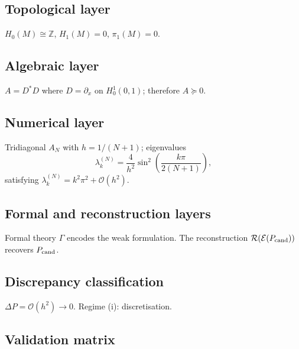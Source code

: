 \documentclass[11pt,a4paper]{article}
\theoremstyle{definition}
\theoremstyle{plain}
\newcommand{\Ecal}{\mathcal{E}}
\newcommand{\Rcal}{\mathcal{R}}
\newcommand{\Z}{\mathbb{Z}}
\begin{document}
\subsection{Topological layer}

$H_0(M) \cong \Z$, $H_1(M) = 0$, $\pi_1(M) = 0$.

\subsection{Algebraic layer}

$A = D^\ast D$ where $D = \partial_x$ on $H_0^1(0,1)$; therefore
$A \succeq 0$.

\subsection{Numerical layer}

Tridiagonal $A_N$ with $h = 1/(N+1)$; eigenvalues
\[
  \lambda_k^{(N)}
  =
  \frac{4}{h^2} \sin^2\!\left( \frac{k \pi}{2(N+1)} \right),
\]
satisfying $\lambda_k^{(N)} = k^2 \pi^2 + \mathcal{O}(h^2)$.

\subsection{Formal and reconstruction layers}

Formal theory $\Gamma$ encodes the weak formulation. The
reconstruction $\Rcal(\Ecal(P_{\rm cand}))$ recovers $P_{\rm cand}$.

\subsection{Discrepancy classification}

$\Delta P = \mathcal{O}(h^2) \to 0$. Regime (i): discretisation.

\subsection{Validation matrix}
\end{document}
